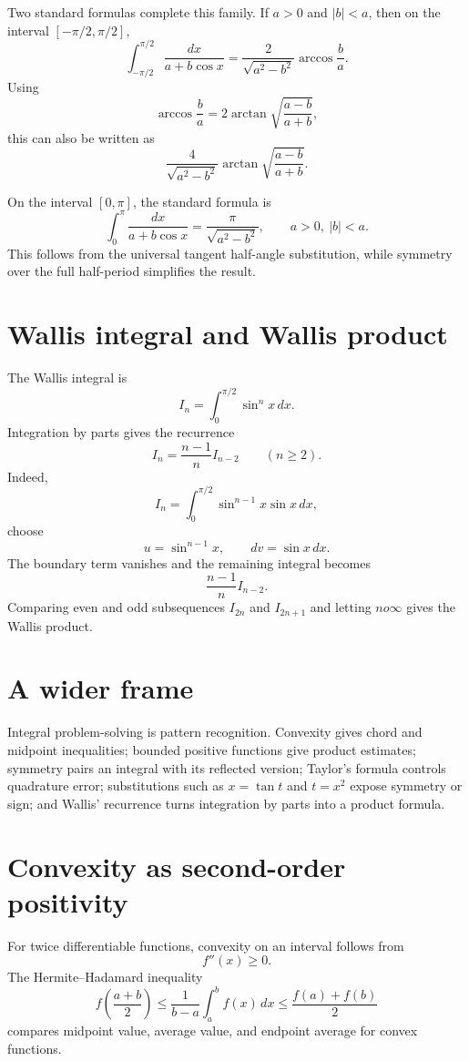 Two standard formulas complete this family.  If $a>0$ and $|b|<a$, then on the interval $[-\pi/2,\pi/2]$,
\[
  \int_{-\pi/2}^{\pi/2}
\frac{dx}{a+b\cos x}
  =
\frac{2}{\sqrt{a^2-b^2}}\arccos
\frac ba.
\]
Using
\[
  \arccos
\frac ba
  =
  2\arctan\sqrt{
\frac{a-b}{a+b}},
\]
this can also be written as
\[
\frac{4}{\sqrt{a^2-b^2}}
  \arctan\sqrt{
\frac{a-b}{a+b}}.
\]

On the interval $[0,\pi]$, the standard formula is
\[
  \int_0^\pi 
\frac{dx}{a+b\cos x}
  =
\frac{\pi}{\sqrt{a^2-b^2}},
  \qquad a>0,\ |b|<a.
\]
This follows from the universal tangent half-angle substitution, while symmetry over the full half-period simplifies the result.

\section{Wallis integral and Wallis product}

The Wallis integral is
\[
  I_n=\int_0^{\pi/2}\sin^n x\,dx.
\]
Integration by parts gives the recurrence
\[
  I_n=
\frac{n-1}{n}I_{n-2}\qquad(n\ge2).
\]
Indeed,
\[
  I_n=\int_0^{\pi/2}\sin^{n-1}x\sin x\,dx,
\]
choose
\[
  u=\sin^{n-1}x,\qquad dv=\sin x\,dx.
\]
The boundary term vanishes and the remaining integral becomes
\[
\frac{n-1}{n}I_{n-2}.
\]
Comparing even and odd subsequences $I_{2n}$ and $I_{2n+1}$ and letting $n	o\infty$ gives the Wallis product.

\section{A wider frame}

Integral problem-solving is pattern recognition.  Convexity gives chord and midpoint inequalities; bounded positive functions give product estimates; symmetry pairs an integral with its reflected version; Taylor's formula controls quadrature error; substitutions such as \(x=\tan t\) and \(t=x^2\) expose symmetry or sign; and Wallis' recurrence turns integration by parts into a product formula.

\section{Convexity as second-order positivity}

For twice differentiable functions, convexity on an interval follows from
\[
  f''(x)\ge0.
\]
The Hermite--Hadamard inequality
\[
  f\left(\frac{a+b}{2}\right)\le \frac1{b-a}\int_a^b f(x)\,dx\le \frac{f(a)+f(b)}2
\]
compares midpoint value, average value, and endpoint average for convex functions.


